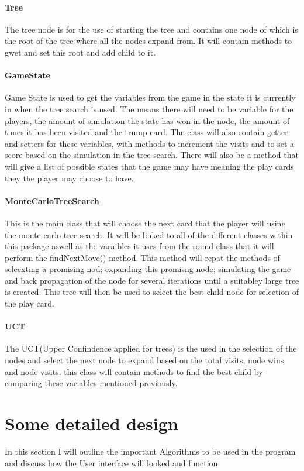\paragraph{Tree}
The tree node is for the use of starting the tree and contains one node of which is the root of the tree where all the nodes expand from. It will contain methods to gwet and set this root and add child to it.
\paragraph{GameState}
Game State is used to get the variables from the game in the state it is currently in when the tree search is used. The means there will need to be variable for the players, the amount of simulation the state has won in the node, the amount of times it has been visited and the trump card. The class will also contain getter and setters for these variables, with methods to increment the visits and to set a score based on the simulation in the tree search. There will also be a method that will give a list of possible states that the game may have meaning the play cards they the player may choose to have.
\paragraph{MonteCarloTreeSearch}
This is the main class that will choose the next card that the player will using the monte carlo tree search. It will be linked to all of the different classes within this package aswell as the varaibles it uses from the round class that it will perform the findNextMove() method. This method will repat the methods of selecxting a promising nod; expanding this promisng node; simulating the game and back propagation of the node for several iterations until a suitabley large tree is created. This tree will then be used to select the best child node for selection of the play card.
\paragraph{UCT}
The UCT(Upper Confindence applied for trees) is the used in the selection of the nodes and select the next node to expand based on the total visits, node wins and node visits. this class will contain methods to find the best child by comparing these variables mentioned previously.
\section{Some detailed design}
In this section I will outline the important Algorithms to be used in the program and discuss how the User interface will looked and function.
